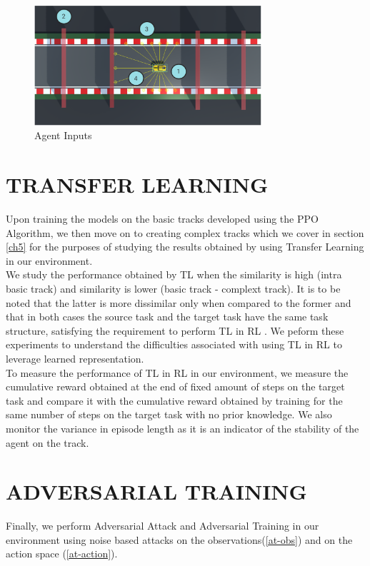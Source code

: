 \begin{figure}[H]
    \centering
    \includegraphics[width=0.75\textwidth]{images/UnityEnv.png}
    \caption{Agent Inputs}
    \label{fig:agent-inputs}
\end{figure}

\section{TRANSFER LEARNING} \label{ch4TL}
Upon training the models on the basic tracks developed using the PPO Algorithm, we then move on to creating complex tracks which we cover in section \ref{ch5} for the purposes of studying the results obtained by using Transfer Learning in our environment. 
\\ We study the performance obtained by TL when the similarity is high (intra basic track) and similarity is lower (basic track - complext track). It is to be noted that the latter is more dissimilar only when compared to the former and that in both cases the source task and the target task have the same task structure, satisfying the requirement to perform TL in RL \cite{TLRLImplement}. We peform these experiments to understand the difficulties associated with using TL in RL to leverage learned representation. 
\\To measure the performance of TL in RL in our environment, we measure the cumulative reward obtained at the end of fixed amount of steps on the target task and compare it with the cumulative reward obtained by training for the same number of steps on the target task with no prior knowledge. We also monitor the variance in  episode length as it is an indicator of the stability of the agent on the track.


\section{ADVERSARIAL  TRAINING} \label{ch4AT}
Finally, we perform Adversarial Attack and Adversarial Training in our environment using noise based attacks on the observations(\ref{at-obs}) and on the action space (\ref{at-action}).
